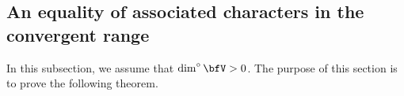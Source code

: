\documentclass[12pt,a4paper]{amsart}
\newcommand{\CO}{{\mathcal {O}}}
\newcommand{\g}{\mathfrak g}
\newcommand{\p}{\mathfrak p}
\numberwithin{equation}{section}
\theoremstyle{remark}
\def\dimo{\dim^\circ}
\def\tGVr{\wtG}
\begin{document}




\subsection{An equality of associated characters in the convergent range}
In this subsection, we assume that
$\dimo \bfV>0$.  The purpose of this section is to prove the following theorem.

\end{document}
